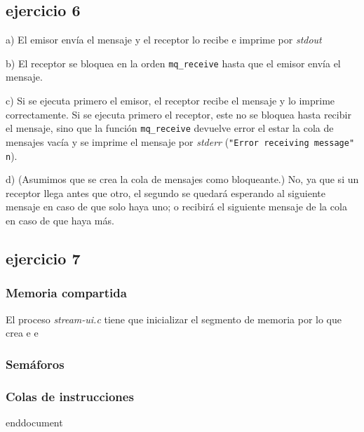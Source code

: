 \documentclass{article}
\begin{document}
\subsection*{ejercicio 6}


a) El emisor envía el mensaje y el receptor lo recibe e imprime por \textit{stdout}

b) El receptor se bloquea en la orden \texttt{mq\_receive} hasta que el emisor envía el mensaje.

c) Si se ejecuta primero el emisor, el receptor recibe el mensaje y lo imprime correctamente. Si se ejecuta primero el receptor, este no se bloquea hasta recibir el mensaje, sino que la función \texttt{mq\_receive} devuelve error el estar la cola de mensajes vacía y se imprime el mensaje por \textit{stderr}
(\texttt{"Error  receiving  message"\\n}). 

d) (Asumimos que se crea la cola de mensajes como bloqueante.) No, ya que si un receptor llega antes que otro, el segundo se quedará esperando al siguiente mensaje en caso de que solo haya uno; o recibirá el siguiente mensaje de la cola en caso de que haya más.




\subsection*{ejercicio 7}


\subsubsection{Memoria compartida}

El proceso \textit{stream-ui.c} tiene que inicializar el segmento de memoria por lo que crea e
e\subsubsection{Semáforos}


\subsubsection{Colas de instrucciones}

end{document}
\end{document}
